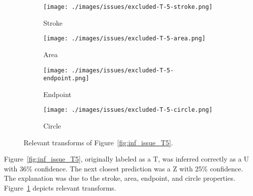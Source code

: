 \begin{figure}[H]
    \centering
    \begin{subfigure}{.20\textwidth}
        \centering
        \texttt{[image: ./images/issues/excluded-T-5-stroke.png]}
        \caption{Stroke}
    \end{subfigure}%
    \begin{subfigure}{.20\textwidth}
        \centering
        \texttt{[image: ./images/issues/excluded-T-5-area.png]}
        \caption{Area}
    \end{subfigure}%
    \begin{subfigure}{.20\textwidth}
        \centering
        \texttt{[image: ./images/issues/excluded-T-5-endpoint.png]}
        \caption{Endpoint}
    \end{subfigure}%
    \begin{subfigure}{.20\textwidth}
        \centering
        \texttt{[image: ./images/issues/excluded-T-5-circle.png]}
        \caption{Circle}
    \end{subfigure}%
    \caption{Relevant transforms of Figure~\ref{fig:inf_issue_T5}.}
    \label{fig:t5_trans}
\end{figure}

Figure~\ref{fig:inf_issue_T5}, originally labeled as a T, was inferred correctly as
a U with 36\% confidence. The next closest prediction was a Z with 25\%
confidence.  The explanation was due to the stroke, area,
endpoint, and circle properties. Figure~\ref{fig:t5_trans}
depicts relevant transforms.

